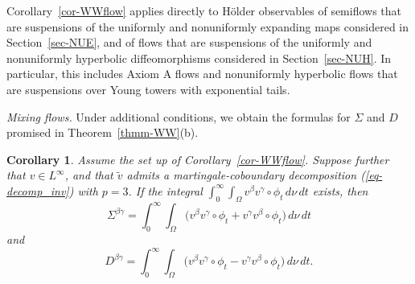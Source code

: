 \documentclass[aop,MSNbibl,seceqn,dvips]{arximspdf}
\newcommand{\eqref}[1]{(\ref{#1})}
\newtheorem{cor}[thmm]{Corollary}
\newcommand{\E}{\mathbb{E}}
\newcommand{\Cov}{\operatorname{Cov}}
\newcommand{\tildev}{\tilde{v}}
\begin{document}
\begin{rmk} \label{rmk-WWflow}
Corollary~\ref{cor-WWflow} applies directly to H\"older observables of
semiflows that are suspensions of the uniformly and nonuniformly
expanding maps considered in Section~\ref{sec-NUE}, and of flows that
are suspensions of the uniformly and nonuniformly hyperbolic
diffeomorphisms considered in Section~\ref{sec-NUH}. In particular,
this includes Axiom A flows and nonuniformly hyperbolic flows that are
suspensions over Young towers with exponential tails.
\end{rmk}

\textit{Mixing flows.}
Under additional conditions, we obtain the formulas for $\Sigma$ and
$D$ promised in Theorem~\ref{thmm-WW}(b).

\begin{cor} \label{cor-WWflowmix}
Assume the set up of Corollary~\ref{cor-WWflow}.
Suppose further that $v\in L^\infty$, and that $\tildev$ admits
a martingale-coboundary decomposition \eqref{eq-decomp_inv} with $p=3$.
If the integral $\int_0^\infty\int_\Omega v^\beta v^\gamma\circ
\phi_t
\,d\nu \,dt$ exists, then
%
\[
\Sigma^{\beta\gamma}= \int_0^\infty\int
_\Omega\bigl(v^\beta v^\gamma\circ
\phi_t+ v^\gamma v^\beta\circ\phi_t
\bigr) \,d\nu \,dt
\]
%
and
%
\[
D^{\beta\gamma}= \int_0^\infty\int
_\Omega\bigl( v^\beta v^\gamma\circ
\phi_t- v^\gamma v^\beta\circ\phi_t\bigr) \,d
\nu \,dt.
\]
%
\end{cor}

\end{document}
